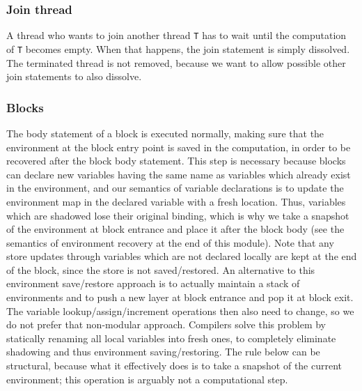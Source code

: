 \documentclass{article}
\begin{document}
\begin{kdefinition}
\begin{module}{}
\begin{kblock}[text]
 \subsubsection{Join thread}
A thread who wants to join another thread \texttt{T} has to wait until
the computation of \texttt{T} becomes empty.  When that happens, the
join statement is simply dissolved.  The terminated thread is not removed,
because we want to allow possible other join statements to also dissolve. \end{kblock}
\begin{kblock}[text]
 \subsubsection{Blocks}
The body statement of a block is executed normally, making sure
that the environment at the block entry point is saved in the computation,
in order to be recovered after the block body statement.  This step is
necessary because blocks can declare new variables having the same
name as variables which already exist in the environment, and our
semantics of variable declarations is to update the environment map in
the declared variable with a fresh location.  Thus, variables which
are shadowed lose their original binding, which is why we take a
snapshot of the environment at block entrance and place it after the
block body (see the semantics of environment recovery at the end of
this module).  Note that any store updates through variables which are
not declared locally are kept at the end of the block, since the store
is not saved/restored.  An alternative to this environment save/restore
approach is to actually maintain a stack of environments and to push a
new layer at block entrance and pop it at block exit.  The variable
lookup/assign/increment operations then also need to change, so we do
not prefer that non-modular approach. Compilers solve this problem by
statically renaming all local variables into fresh ones, to completely
eliminate shadowing and thus environment saving/restoring.  The rule
below can be structural, because what it effectively does is to take a
snapshot of the current environment; this operation is arguably not a
computational step. \end{kblock}
\begin{kblock}[text]

\end{kblock}
\end{module}
\end{kdefinition}
\end{document}
